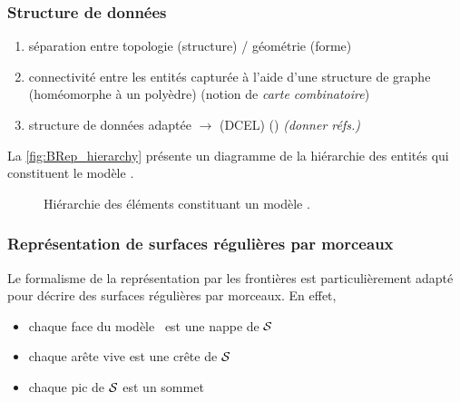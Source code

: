\subsubsection{Structure de données}
\begin{enumerate}
	\item séparation entre topologie (structure) / géométrie (forme)
	\item connectivité entre les entités capturée à l'aide d'une structure de graphe (homéomorphe à un polyèdre) (notion de \textit{carte combinatoire})
	\item structure de données adaptée $\to$  (DCEL) () \textit{(donner réfs.)}
\end{enumerate}

La \autoref{fig:BRep_hierarchy} présente un diagramme de la hiérarchie des entités qui constituent le modèle \brep.
\begin{figure}
	\centering
	
	\caption{Hiérarchie des éléments constituant un modèle \brep.}
	\label{fig:BRep_hierarchy}
\end{figure}


\subsubsection{Représentation de surfaces régulières par morceaux}
Le formalisme de la représentation par les frontières est particulièrement adapté pour décrire des surfaces régulières par morceaux. 
En effet, 
\begin{itemize}
	\item chaque face du modèle \brep\ est une nappe de $\mathcal{S}$
	\item chaque arête vive est une crête de $\mathcal{S}$
	\item chaque pic de $\mathcal{S}$ est un sommet \brep
\end{itemize}











